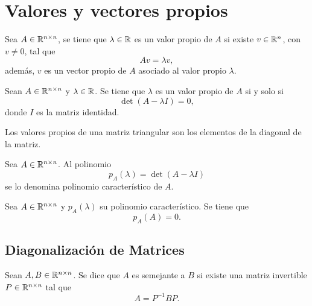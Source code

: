 \documentclass[a4,11pt]{aleph-notas}
\begin{document}
\encabezado

\section{Valores y vectores propios}

\begin{defi}
    Sea $A\in \Mat[\R]{n}{n}$, se tiene que $\lambda\in \R$ es un valor propio de $A$ si existe $v\in \R^n$, con $v\neq 0$, tal que
    \[
        Av = \lambda v,
    \]
    además, $v$ es un vector propio de $A$ asociado al valor propio $\lambda$.
\end{defi}


\begin{teo}
   Sean $A\in \Mat[\R]{n}{n}$ y $\lambda \in \R$. Se tiene que $\lambda$ es un valor propio de $A$ si y solo si
   \[
        \det(A - \lambda I) = 0,
   \]
   donde $I$ es la matriz identidad.
\end{teo}

\begin{teo}
    Los valores propios de una matriz triangular son los elementos de la diagonal de la matriz. 
\end{teo}


\begin{defi}
    Sea $A\in \Mat[\R]{n}{n}$. Al polinomio
    \[
        p_A(\lambda) = \det(A - \lambda I)
    \]
    se lo denomina polinomio característico de $A$.
\end{defi}


\begin{teo}
    Sea $A\in \Mat[\R]{n}{n}$ y $p_A(\lambda)$ su polinomio característico. Se tiene que
    \[
        p_A(A) = 0.
    \]
\end{teo}


\subsection{Diagonalización de Matrices}

\begin{defi}
    Sean $A,B\in \Mat[\R]{n}{n}$. Se dice que $A$ es semejante a $B$ si existe una matriz invertible $P\in \Mat[\R]{n}{n}$ tal que
    \[
        A = P^{-1} B P.
    \]
\end{defi}
\end{document}
